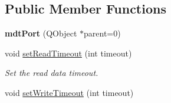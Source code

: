 \subsection*{Public Member Functions}
\begin{DoxyCompactItemize}
\item 
\hypertarget{classmdt_port_ac466eac9d1a54ea0e04c998660ad75ec}{
{\bfseries mdtPort} (QObject $\ast$parent=0)}
\label{classmdt_port_ac466eac9d1a54ea0e04c998660ad75ec}

\item 
\hypertarget{classmdt_port_aa77b266f23744f1b53ae589f986be101}{
void \hyperlink{classmdt_port_aa77b266f23744f1b53ae589f986be101}{setReadTimeout} (int timeout)}
\label{classmdt_port_aa77b266f23744f1b53ae589f986be101}

\begin{DoxyCompactList}\small\item\em Set the read data timeout. \end{DoxyCompactList}\item 
\hypertarget{classmdt_port_a2acb6e7bedacdadf78ee735dc611abfa}{
void \hyperlink{classmdt_port_a2acb6e7bedacdadf78ee735dc611abfa}{setWriteTimeout} (int timeout)}
\label{classmdt_port_a2acb6e7bedacdadf78ee735dc611abfa}


\end{DoxyCompactItemize}
